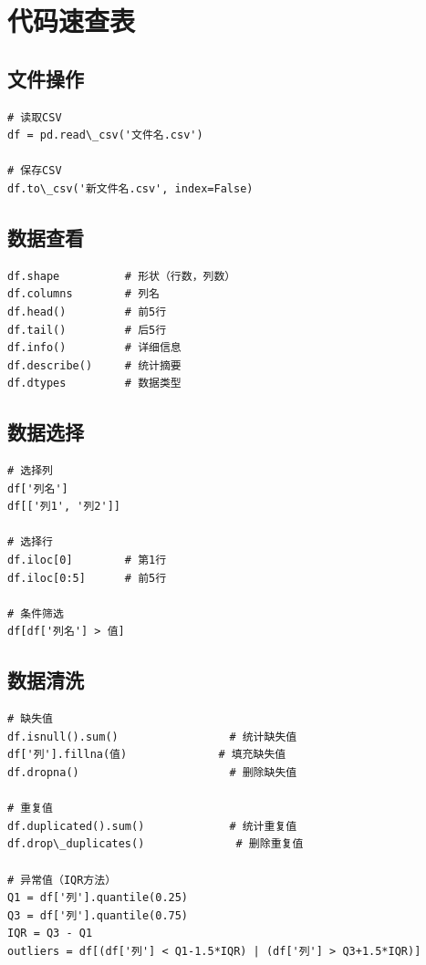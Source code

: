 \documentclass[12pt,a4paper]{article}
\begin{document}
\section{代码速查表}

\subsection{文件操作}

\begin{lstlisting}[caption={读取和保存CSV}]
# 读取CSV
df = pd.read\_csv('文件名.csv')

# 保存CSV
df.to\_csv('新文件名.csv', index=False)
\end{lstlisting}

\subsection{数据查看}

\begin{lstlisting}[caption={数据查看}]
df.shape          # 形状（行数，列数）
df.columns        # 列名
df.head()         # 前5行
df.tail()         # 后5行
df.info()         # 详细信息
df.describe()     # 统计摘要
df.dtypes         # 数据类型
\end{lstlisting}

\subsection{数据选择}

\begin{lstlisting}[caption={数据选择}]
# 选择列
df['列名']
df[['列1', '列2']]

# 选择行
df.iloc[0]        # 第1行
df.iloc[0:5]      # 前5行

# 条件筛选
df[df['列名'] > 值]
\end{lstlisting}

\subsection{数据清洗}

\begin{lstlisting}[caption={数据清洗}]
# 缺失值
df.isnull().sum()                 # 统计缺失值
df['列'].fillna(值)              # 填充缺失值
df.dropna()                       # 删除缺失值

# 重复值
df.duplicated().sum()             # 统计重复值
df.drop\_duplicates()              # 删除重复值

# 异常值（IQR方法）
Q1 = df['列'].quantile(0.25)
Q3 = df['列'].quantile(0.75)
IQR = Q3 - Q1
outliers = df[(df['列'] < Q1-1.5*IQR) | (df['列'] > Q3+1.5*IQR)]
\end{lstlisting}
\end{document}
